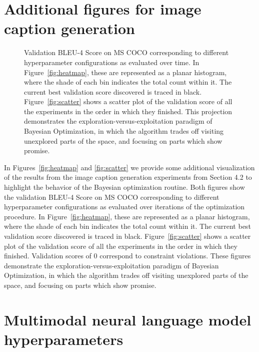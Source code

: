 \documentclass{article}
\begin{document}
\section{Additional figures for image caption generation}
\begin{figure*}[t]
\centering {}

\caption{Validation BLEU-4 Score on MS COCO corresponding to different hyperparameter configurations as evaluated over time. In Figure~\ref{fig:heatmap}, these are represented as a planar histogram, where the shade of each bin indicates the total count within it. The current best validation score discovered is traced in black. Figure~\ref{fig:scatter} shows a scatter plot of the validation score of all the experiments in the order in which they finished.  This projection demonstrates the exploration-versus-exploitation paradigm of Bayesian Optimization, in which the algorithm trades off visiting unexplored parts of the space, and focusing on parts which show promise.
}
\end{figure*}
In Figures~\ref{fig:heatmap} and \ref{fig:scatter} we provide some additional visualization of the results from the image caption generation experiments from Section 4.2 to highlight the behavior of the Bayesian optimization routine.  Both figures show the validation BLEU-4 Score on MS COCO corresponding to different hyperparameter configurations as evaluated over iterations of the optimization procedure. In Figure~\ref{fig:heatmap}, these are represented as a planar histogram, where the shade of each bin indicates the total count within it. The current best validation score discovered is traced in black. Figure~\ref{fig:scatter} shows a scatter plot of the validation score of all the experiments in the order in which they finished.  Validation scores of 0 correspond to constraint violations.  These figures demonstrate the exploration-versus-exploitation paradigm of Bayesian Optimization, in which the algorithm trades off visiting unexplored parts of the space, and focusing on parts which show promise.

\section{Multimodal neural language model hyperparameters}
\end{document}

